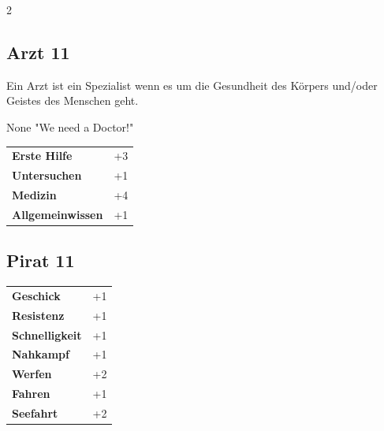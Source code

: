 \begin{multicols}{2}
\begin{tcolorbox}
    \subsection*{Arzt \hfill \small{11 }}
    \tcblower
Ein Arzt ist ein Spezialist wenn es um die Gesundheit des Körpers und/oder Geistes des Menschen geht.

\begin{pquote}{None}
"We need a Doctor!"
\end{pquote}

\vspace{3mm}

\begin{tabular}{@{}ll@{}}
    \textbf{Erste Hilfe} & +3\\
    \textbf{Untersuchen} & +1\\
    \textbf{Medizin} & +4\\
    \textbf{Allgemeinwissen} & +1\\
\end{tabular}


\end{tcolorbox}

\begin{tcolorbox}
    \subsection*{Pirat \hfill \small{11 }}
    \tcblower




\begin{tabular}{@{}ll@{}}
    \textbf{Geschick} & +1\\
    \textbf{Resistenz} & +1\\
    \textbf{Schnelligkeit} & +1\\
    \textbf{Nahkampf} & +1\\
    \textbf{Werfen} & +2\\
    \textbf{Fahren} & +1\\
    \textbf{Seefahrt} & +2\\
\end{tabular}


\end{tcolorbox}
\end{multicols}
